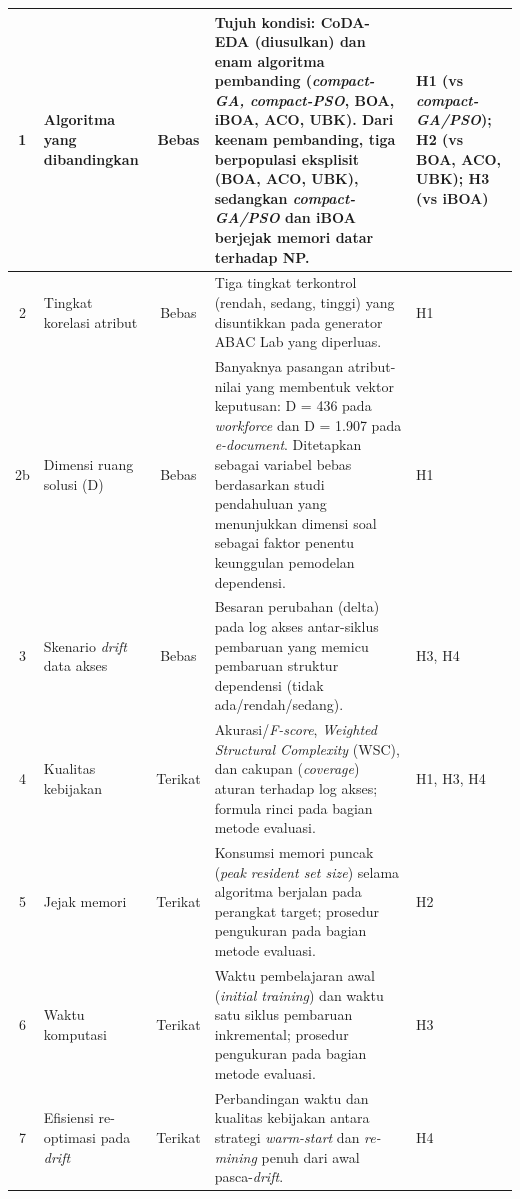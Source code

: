 \begin{longtable}{|c|>{\raggedright\arraybackslash}p{3cm}|c|>{\raggedright\arraybackslash}p{5cm}|>{\centering\arraybackslash}p{3cm}|}
1 & Algoritma yang dibandingkan & Bebas & Tujuh kondisi: CoDA-EDA (diusulkan) dan enam algoritma pembanding (\textit{compact-GA, compact-PSO}, BOA, iBOA, ACO, UBK). Dari keenam pembanding, tiga berpopulasi eksplisit (BOA, ACO, UBK), sedangkan \textit{compact-GA/PSO} dan iBOA berjejak memori datar terhadap NP. & H1 (vs \textit{compact-GA/PSO}); H2 (vs BOA, ACO, UBK); H3 (vs iBOA) \\
\hline
2 & Tingkat korelasi atribut & Bebas & Tiga tingkat terkontrol (rendah, sedang, tinggi) yang disuntikkan pada generator ABAC Lab yang diperluas. & H1 \\
\hline
2b & Dimensi ruang solusi (D) & Bebas & Banyaknya pasangan atribut-nilai yang membentuk vektor keputusan: D = 436 pada \textit{workforce} dan D = 1.907 pada \textit{e-document}. Ditetapkan sebagai variabel bebas berdasarkan studi pendahuluan yang menunjukkan dimensi soal sebagai faktor penentu keunggulan pemodelan dependensi. & H1 \\
\hline
3 & Skenario \textit{drift} data akses & Bebas & Besaran perubahan (delta) pada log akses antar-siklus pembaruan yang memicu pembaruan struktur dependensi (tidak ada/rendah/sedang). & H3, H4 \\
\hline
4 & Kualitas kebijakan & Terikat & Akurasi/\textit{F-score}, \textit{Weighted Structural Complexity} (WSC), dan cakupan (\textit{coverage}) aturan terhadap log akses; formula rinci pada bagian metode evaluasi. & H1, H3, H4 \\
\hline
5 & Jejak memori & Terikat & Konsumsi memori puncak (\textit{peak resident set size}) selama algoritma berjalan pada perangkat target; prosedur pengukuran pada bagian metode evaluasi. & H2 \\
\hline
6 & Waktu komputasi & Terikat & Waktu pembelajaran awal (\textit{initial training}) dan waktu satu siklus pembaruan inkremental; prosedur pengukuran pada bagian metode evaluasi. & H3 \\
\hline
7 & Efisiensi re-optimasi pada \textit{drift} & Terikat & Perbandingan waktu dan kualitas kebijakan antara strategi \textit{warm-start} dan \textit{re-mining} penuh dari awal pasca-\textit{drift}. & H4 \\
\hline

\end{longtable}
